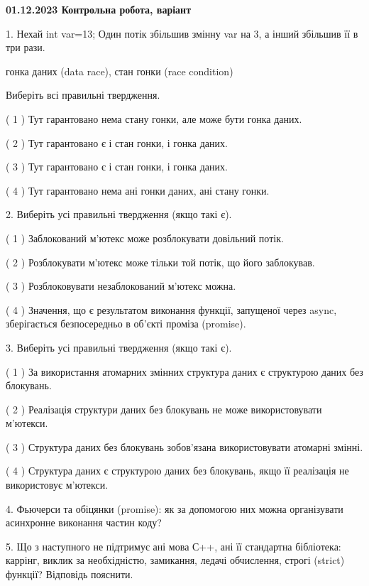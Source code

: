 \documentclass[12pt, ukrainian]{article}
\begin{document}
\vspace{4mm}
\newpage
\begin {large}

\textbf{01.12.2023 Контрольна робота, варіант  }\par


{
1. Нехай int var=13; Один потік збільшив змінну var на 3, а інший збільшив її в три рази.

гонка даних (data race), стан гонки (race condition)

Виберіть всі правильні твердження.\par
\vspace{2mm}
( 1 ) Тут гарантовано нема стану гонки, але може бути гонка даних.%

( 2 ) Тут гарантовано є і стан гонки, і гонка даних.%

( 3 ) Тут гарантовано є і стан гонки, і гонка даних.%

( 4 ) Тут гарантовано нема ані гонки даних, ані стану гонки.%


\vspace{5mm}
2. Виберіть усі правильні твердження (якщо такі є).\par
\vspace{2mm}

( 1 ) Заблокований м’ютекс може розблокувати довільний потік.%

( 2 ) Розблокувати м’ютекс може тільки той потік, що його заблокував.%

( 3 ) Розблоковувати незаблокований м’ютекс можна.%

( 4 ) Значення, що є результатом виконання функції, запущеної через async, зберігається безпосередньо в об’єкті проміза (promise).%


\vspace{5mm}
3. Виберіть усі правильні твердження (якщо такі є).\par
\vspace{2mm}

( 1 ) За використання атомарних змінних структура даних є структурою даних без блокувань.%

( 2 ) Реалізація структури даних без блокувань не може використовувати м’ютекси.%

( 3 ) Структура даних без блокувань зобов’язана використовувати атомарні змінні.%

( 4 ) Структура даних є структурою даних без блокувань, якщо її реалізація не використовує м’ютекси.%


\vspace{5mm}
4. Фьючерси та обіцянки (promise): як за допомогою них можна організувати асинхронне виконання частин коду?



\vspace{5mm}
5. Що з наступного не підтримує ані мова С++, ані її стандартна бібліотека: каррінг, виклик за необхідністю, замикання, ледачі обчислення, строгі (strict) функції? Відповідь пояснити.
}
\end {large}
\end{document}
